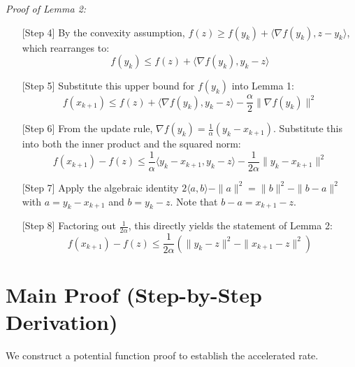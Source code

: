\documentclass[11pt]{article}
\begin{document}
\textit{Proof of Lemma 2:}
\begin{itemize}
    \item[{[Step 4]}] By the convexity assumption, $f(z) \ge f(y_k) + \langle \nabla f(y_k), z - y_k \rangle$, which rearranges to:
    $$f(y_k) \le f(z) + \langle \nabla f(y_k), y_k - z \rangle$$
    \item[{[Step 5]}] Substitute this upper bound for $f(y_k)$ into Lemma 1:
    $$f(x_{k+1}) \le f(z) + \langle \nabla f(y_k), y_k - z \rangle - \frac{\alpha}{2} \|\nabla f(y_k)\|^2$$
    \item[{[Step 6]}] From the update rule, $\nabla f(y_k) = \frac{1}{\alpha}(y_k - x_{k+1})$. Substitute this into both the inner product and the squared norm:
    $$f(x_{k+1}) - f(z) \le \frac{1}{\alpha} \langle y_k - x_{k+1}, y_k - z \rangle - \frac{1}{2\alpha} \|y_k - x_{k+1}\|^2$$
    \item[{[Step 7]}] Apply the algebraic identity $2\langle a, b \rangle - \|a\|^2 = \|b\|^2 - \|b-a\|^2$ with $a = y_k - x_{k+1}$ and $b = y_k - z$. Note that $b - a = x_{k+1} - z$.
    \item[{[Step 8]}] Factoring out $\frac{1}{2\alpha}$, this directly yields the statement of Lemma 2:
    $$f(x_{k+1}) - f(z) \le \frac{1}{2\alpha} \left( \|y_k - z\|^2 - \|x_{k+1} - z\|^2 \right)$$
\end{itemize}

\section*{Main Proof (Step-by-Step Derivation)}

We construct a potential function proof to establish the accelerated rate.
\end{document}
